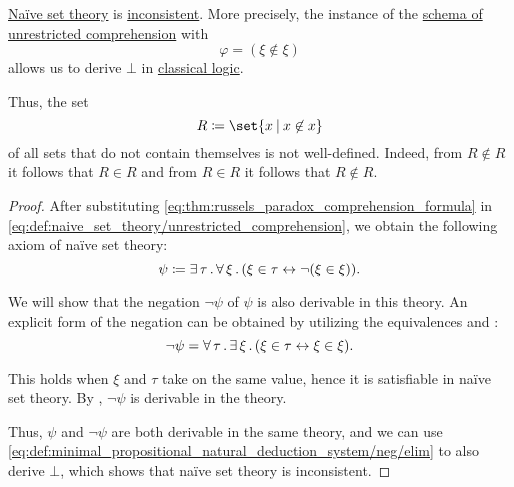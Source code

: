 \begin{theorem}\label{thm:russels_paradox}
  \hyperref[def:naive_set_theory]{Na\"ive set theory} is \hyperref[def:first_order_theory/consistent]{inconsistent}. More precisely, the instance of the \hyperref[def:naive_set_theory/unrestricted_comprehension]{schema of unrestricted comprehension} with
  \begin{equation}\label{eq:thm:russels_paradox_comprehension_formula}
    \varphi = (\xi \not\in \xi)
  \end{equation}
  allows us to derive \( \bot \) in \hyperref[rem:classical_logic]{classical logic}.

  Thus, the set
  \begin{equation}\label{eq:thm:russels_paradox_set}
    R \coloneqq \set{ x \given x \not\in x }
  \end{equation}
  of all sets that do not contain themselves is not well-defined. Indeed, from \( R \not\in R \) it follows that \( R \in R \) and from \( R \in R \) it follows that \( R \not\in R \).
\end{theorem}
\begin{proof}
  After substituting \eqref{eq:thm:russels_paradox_comprehension_formula} in \eqref{eq:def:naive_set_theory/unrestricted_comprehension}, we obtain the following axiom of na\"ive set theory:
  \begin{equation}\label{eq:thm:russels_paradox_comprehension_axiom}
    \psi \coloneqq \exists \thinspace \tau \thinspace . \thinspace \forall \thinspace \xi \thinspace . \thinspace (\xi \in \tau \leftrightarrow \neg (\xi \in \xi)).
  \end{equation}

  We will show that the negation \( \neg\psi \) of \( \psi \) is also derivable in this theory. An explicit form of the negation can be obtained by utilizing the equivalences  and :
  \begin{equation*}
    \neg\psi = \forall \thinspace \tau \thinspace . \thinspace \exists \thinspace \xi \thinspace . \thinspace (\xi \in \tau \leftrightarrow \xi \in \xi).
  \end{equation*}

  This holds when \( \xi \) and \( \tau \) take on the same value, hence it is satisfiable in na\"ive set theory. By , \( \neg\psi \) is derivable in the theory.

  Thus, \( \psi \) and \( \neg\psi \) are both derivable in the same theory, and we can use \eqref{eq:def:minimal_propositional_natural_deduction_system/neg/elim} to also derive \( \bot \), which shows that na\"ive set theory is inconsistent.
\end{proof}

